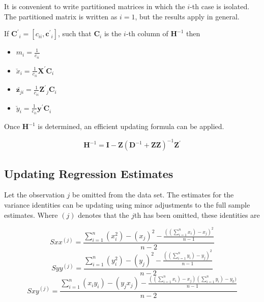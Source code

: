 \documentclass[12pt, a4paper]{report}
\theoremstyle{plain}
\theoremstyle{definition}
\theoremstyle{remark}
\begin{document}
	It is convenient to write partitioned matrices in which the $i$-th case is isolated. The partitioned matrix is written as $ i = 1$, but the results apply in general.
	
	If $\boldsymbol{C^{\prime}}_{i}  = [c_{ii}, \boldsymbol{c^{\prime}}_{i}]$, such that  $\boldsymbol{C}_{i}$ is the
	$i$-th column of $\boldsymbol{H}^{-1}$ then
	
	
	\begin{itemize}
		\item $m_{i} = \frac{1}{c_{ii}}$\\
		\item $\breve{x}_{i} = \frac{1}{c_{ii}}\boldsymbol{X^{\prime}C}_{i}$\\
		\item $\breve{\boldsymbol{z}_{ji}} = \frac{1}{c_{ii}}\boldsymbol{Z^{\prime}}_{j}\boldsymbol{C}_{i}$\\
		\item $\breve{y}_{i} = \frac{1}{c_{ii}}\boldsymbol{y^{\prime}C}_{i}$\\
	\end{itemize}
	
	Once $\boldsymbol{H}^{-1}$ is determined, an efficient updating formula can be applied.
	
	
	
	\begin{equation}
	\boldsymbol{H}^{-1} = \boldsymbol{I} - \boldsymbol{Z}(\boldsymbol{D}^{-1} + \boldsymbol{ZZ})^{-1}\boldsymbol{Z^{\prime}}
	\end{equation}
	
	
	
	
	
	\subsection{Updating Regression Estimates}
	Let the observation $j$ be omitted from the data set. The estimates for the variance identities can be updating using minor adjustments to the full sample estimates. Where $(j)$ denotes that the $j$th has been omitted, these identities are
	
	\begin{equation}
	Sxx^{(j)}=\frac{\sum_{i=1}^{n}(x_{i}^{2})-(x_{j})^{2}-\frac{((\sum_{i=1}^{n}x_{i})-x_{j})^{2}}{n-1}}{n-2}
	\end{equation}
	\begin{equation}
	Syy^{(j)}=\frac{\sum_{i=1}^{n}(y_{i}^{2})-(y_{j})^{2}-\frac{((\sum_{i=1}^{n}y_{i})-y_{j})^{2}}{n-1}}{n-2}
	\end{equation}
	\begin{equation}
	Sxy^{(j)}=\frac{\sum_{i=1}^{n}(x_{i}y_{i})-(y_{j}x_{j})-\frac{((\sum_{i=1}^{n}x_{i})-x_{j})(\sum_{i=1}^{n}y_{i})-y_{k})}{n-1}}{n-2}
	\end{equation}
	
\end{document}
